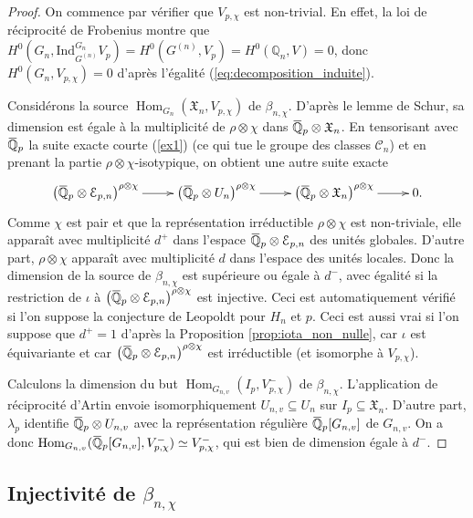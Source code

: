 \documentclass[12pt]{amsart}
\newcommand\bQ{\mathbb{Q}}
\newcommand\cC{\mathcal{C}}
\newcommand\cE{\mathcal{E}}
\newcommand\gX{\mathfrak{X}}
\newcommand{\ob}[1]{\mkern 1.5mu\overline{\mkern-1.5mu#1\mkern-1.5mu}\mkern 1.5mu}
\newcommand{\Ind}{\mathrm{Ind}}
\DeclareMathOperator{\Hom}{Hom}
\theoremstyle{defstyle}
\theoremstyle{thmstyle}
\begin{document}
\begin{proof}
	On commence par vérifier que $V_{p,\chi}$ est non-trivial. En effet, la loi de réciprocité de Frobenius montre que $H^0(G_n,\Ind_{G^{(n)}}^{G_n}V_p)=H^0(G^{(n)},V_p)=H^0(\bQ_n,V)=0$, donc $H^0(G_n,V_{p,\chi})=0$ d'après l'égalité (\ref{eq:decomposition_induite}). 
	 
	Considérons la source $\Hom_{G_n}(\gX_n,V_{p,\chi})$ de $\beta_{n,\chi}$. D'après le lemme de Schur, sa dimension est égale à la multiplicité de $\rho\otimes\chi$ dans $\ob{\bQ}_p \otimes \gX_n$. En tensorisant avec $\ob{\bQ}_p$ la suite exacte courte (\ref{ex1}) (ce qui tue le groupe des classes $\cC_n$) et en prenant la partie $\rho\otimes\chi$-isotypique, on obtient une autre suite exacte
	$$\xymatrix{
		\left(\ob{\bQ}_p \otimes \cE_{p,n}\right)^{\rho\otimes\chi} \ar[r] & \left(\ob{\bQ}_p \otimes U_n\right)^{\rho\otimes\chi} \ar[r] & \left(\ob{\bQ}_p \otimes \gX_n\right)^{\rho\otimes\chi} \ar[r] & 0.
	}$$ 
	 Comme $\chi$ est pair et que la représentation irréductible $\rho\otimes\chi$ est non-triviale, elle apparaît avec multiplicité $d^+$ dans l'espace $\ob{\bQ}_p \otimes \cE_{p,n}$ des unités globales. D'autre part, $\rho\otimes\chi$ apparaît avec multiplicité $d$ dans l'espace des unités locales. Donc la dimension de la source de $\beta_{n,\chi}$ est supérieure ou égale à $d^-$, avec égalité si la restriction de $\iota$ à $\left(\ob{\bQ}_p\otimes \cE_{p,n}\right)^{\rho\otimes\chi}$ est injective. Ceci est automatiquement vérifié si l'on suppose la conjecture de Leopoldt pour $H_n$ et $p$. Ceci est aussi vrai si l'on suppose que $d^+=1$ d'après la Proposition \ref{prop:iota_non_nulle}, car $\iota$ est équivariante et car $\left(\ob{\bQ}_p\otimes \cE_{p,n}\right)^{\rho\otimes\chi}$ est irréductible (et isomorphe à $V_{p,\chi}$). 
	 	
	Calculons la dimension du but $\Hom_{G_{n,v}}({I_p},V_{p,\chi}^-)$ de $\beta_{n,\chi}$. L'application de réciprocité d'Artin envoie isomorphiquement $U_{n,v} \subseteq U_n$ sur ${I_p} \subseteq \gX_n$. D'autre part, $\lambda_p$ identifie $\ob{\bQ}_p \otimes U_{n,v}$ avec la représentation régulière $\ob{\bQ}_p[G_{n,v}]$ de $G_{n,v}$. On a donc $\Hom_{G_{n,v}}(\ob{\bQ}_p[G_{n,v}],V_{p,\chi}^-) \simeq V_{p,\chi}^-$, qui est bien de dimension égale à $d^-$. 
\end{proof}

\subsection{Injectivité de $\beta_{n,\chi}$}\label{sec:BB}
\end{document}
